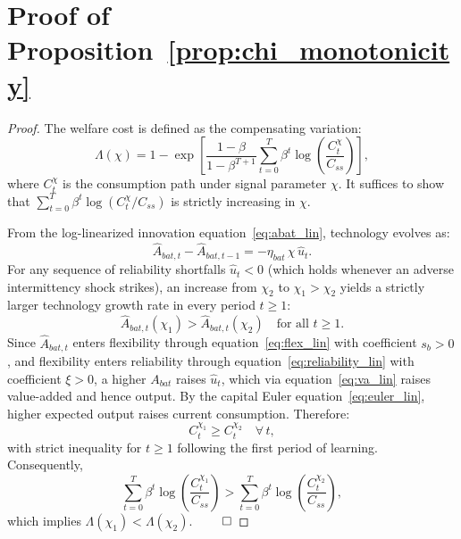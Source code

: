 \documentclass[12pt, a4paper]{article}
\begin{document}
\section{Proof of Proposition~\ref{prop:chi_monotonicity}} \label{app:proof_chi}

\begin{proof}
The welfare cost is defined as the compensating variation:
\begin{equation*}
\Lambda(\chi) = 1 - \exp\!\left[\frac{1-\beta}{1-\beta^{T+1}} \sum_{t=0}^{T} \beta^t \log\!\left(\frac{C_t^{\chi}}{C_{ss}}\right)\right],
\end{equation*}
where $C_t^{\chi}$ is the consumption path under signal parameter $\chi$. It suffices to show that $\sum_{t=0}^{T}\beta^t \log(C_t^{\chi}/C_{ss})$ is strictly increasing in $\chi$.

From the log-linearized innovation equation~\eqref{eq:abat_lin}, technology evolves as:
\begin{equation*}
\hat{A}_{bat,t} - \hat{A}_{bat,t-1} = -\eta_{bat}\,\chi\,\hat{u}_t.
\end{equation*}
For any sequence of reliability shortfalls $\hat{u}_t < 0$ (which holds whenever an adverse intermittency shock strikes), an increase from $\chi_2$ to $\chi_1 > \chi_2$ yields a strictly larger technology growth rate in every period $t \geq 1$:
\begin{equation*}
\hat{A}_{bat,t}(\chi_1) > \hat{A}_{bat,t}(\chi_2)\quad \text{for all } t \geq 1.
\end{equation*}
Since $\hat{A}_{bat,t}$ enters flexibility through equation~\eqref{eq:flex_lin} with coefficient $s_b > 0$, and flexibility enters reliability through equation~\eqref{eq:reliability_lin} with coefficient $\xi > 0$, a higher $A_{bat}$ raises $\hat{u}_t$, which via equation~\eqref{eq:va_lin} raises value-added and hence output. By the capital Euler equation~\eqref{eq:euler_lin}, higher expected output raises current consumption. Therefore:
\begin{equation*}
C_t^{\chi_1} \geq C_t^{\chi_2}\quad \forall\, t,
\end{equation*}
with strict inequality for $t \geq 1$ following the first period of learning. Consequently,
\begin{equation*}
\sum_{t=0}^{T}\beta^t \log\!\left(\frac{C_t^{\chi_1}}{C_{ss}}\right) > \sum_{t=0}^{T}\beta^t \log\!\left(\frac{C_t^{\chi_2}}{C_{ss}}\right),
\end{equation*}
which implies $\Lambda(\chi_1) < \Lambda(\chi_2)$. $\qed$
\end{proof}
\end{document}

